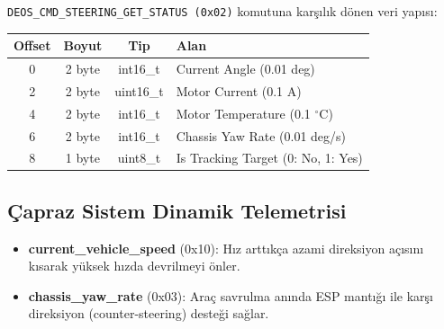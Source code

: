 \documentclass[a4paper,10pt]{article}
\newcommand{\code}[1]{\texttt{#1}}
\begin{document}
\code{DEOS\_CMD\_STEERING\_GET\_STATUS (0x02)} komutuna karşılık dönen veri yapısı:

\begin{center}
\begin{tabular}{c c c l}
\toprule
\textbf{Offset} & \textbf{Boyut} & \textbf{Tip} & \textbf{Alan} \\
\midrule
0 & 2 byte & int16\_t  & Current Angle (0.01 deg) \\
2 & 2 byte & uint16\_t & Motor Current (0.1 A) \\
4 & 2 byte & int16\_t  & Motor Temperature (0.1 $^\circ$C) \\
6 & 2 byte & int16\_t  & Chassis Yaw Rate (0.01 deg/s) \\
8 & 1 byte & uint8\_t  & Is Tracking Target (0: No, 1: Yes) \\
\bottomrule
\end{tabular}
\end{center}

\subsection{Çapraz Sistem Dinamik Telemetrisi}
\begin{itemize}
    \item \textbf{current\_vehicle\_speed} (0x10): Hız arttıkça azami direksiyon açısını kısarak yüksek hızda devrilmeyi önler.
    \item \textbf{chassis\_yaw\_rate} (0x03): Araç savrulma anında ESP mantığı ile karşı direksiyon (counter-steering) desteği sağlar.
\end{itemize}
\end{document}
